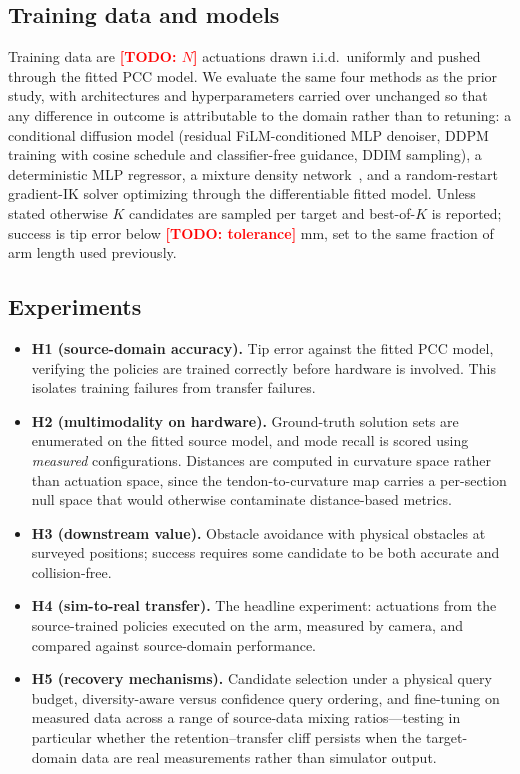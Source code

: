 \documentclass[letterpaper, 10pt, conference]{ieeeconf}
\newcommand{\todo}[1]{\textcolor{red}{\textbf{[TODO: #1]}}}
\begin{document}
\subsection{Training data and models}

Training data are \todo{$N$} actuations drawn i.i.d.\ uniformly and pushed
through the fitted PCC model. We evaluate the same four methods as the prior
study, with architectures and hyperparameters carried over unchanged so that
any difference in outcome is attributable to the domain rather than to
retuning: a conditional diffusion model (residual FiLM-conditioned MLP
denoiser, DDPM training with cosine schedule and classifier-free guidance,
DDIM sampling), a deterministic MLP regressor, a mixture density
network~\cite{bishop1994mixture}, and a random-restart gradient-IK solver
optimizing through the differentiable fitted model. Unless stated otherwise
$K$ candidates are sampled per target and best-of-$K$ is reported; success is
tip error below \todo{tolerance} mm, set to the same fraction of arm length
used previously.

\subsection{Experiments}

\begin{itemize}
  \item \textbf{H1 (source-domain accuracy).} Tip error against the fitted
  PCC model, verifying the policies are trained correctly before hardware is
  involved. This isolates training failures from transfer failures.

  \item \textbf{H2 (multimodality on hardware).} Ground-truth solution sets
  are enumerated on the fitted source model, and mode recall is scored using
  \emph{measured} configurations. Distances are computed in curvature space
  rather than actuation space, since the tendon-to-curvature map carries a
  per-section null space that would otherwise contaminate distance-based
  metrics.

  \item \textbf{H3 (downstream value).} Obstacle avoidance with physical
  obstacles at surveyed positions; success requires some candidate to be both
  accurate and collision-free.

  \item \textbf{H4 (sim-to-real transfer).} The headline experiment:
  actuations from the source-trained policies executed on the arm, measured
  by camera, and compared against source-domain performance.

  \item \textbf{H5 (recovery mechanisms).} Candidate selection under a
  physical query budget, diversity-aware versus confidence query ordering,
  and fine-tuning on measured data across a range of source-data mixing
  ratios---testing in particular whether the retention--transfer cliff
  persists when the target-domain data are real measurements rather than
  simulator output.
\end{itemize}
\end{document}
